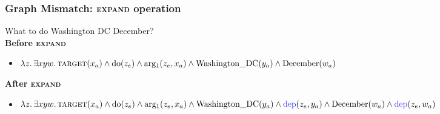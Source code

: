 \documentclass[mathserif,12pt]{beamer}
\newcommand{\hlight}[1]{{\color{blue!80} #1}}
\newcommand \expand{\textsc{expand}\xspace}
\renewcommand{\land}{\wedge}
\newcommand{\lspace}{.\,}
\begin{document}
\begin{frame}[noframenumbering]
\frametitle{Graph Mismatch: \expand operation}

 What to do Washington DC December? \\
 

 \vspace{0.5cm} 
 \textbf{Before \expand}
 \begin{itemize}
   \item $\lambda z \lspace \exists x y w \lspace \textsc{target}(x_a) \land
\mathrm{do}(z_e) \land \mathrm{arg_1}(z_e, x_a) \land
\mathrm{Washington\_DC}(y_a) \land \mathrm{December}(w_a)$
   \end{itemize}
 
 \vspace{0.5cm}
 \textbf{After \expand}
 \begin{itemize}
   \item $\lambda z\lspace \exists x y w \lspace \textsc{target}(x_a) \land \mathrm{do}(z_e) \land \mathrm{arg_1}(z_e, x_a) \land \mathrm{Washington\_DC}(y_a) \land
   \mathrm{\hlight{dep}}(z_e, y_a) \land \mathrm{December}(w_a) \land \mathrm{\hlight{dep}}(z_e, w_a)$
   \end{itemize}
\end{frame}
\end{document}
